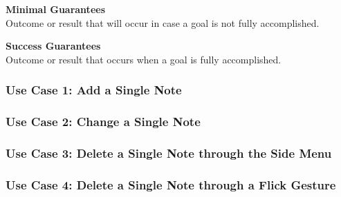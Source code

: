   \textbf{Minimal Guarantees} \\
  Outcome or result that will occur in case a goal is not fully accomplished.

  \textbf{Success Guarantees} \\
  Outcome or result that occurs when a goal is fully accomplished.




  \subsubsection{Use Case 1: Add a Single Note}


  \subsubsection{Use Case 2: Change a Single Note}


  \subsubsection{Use Case 3: Delete a Single Note through the Side Menu}


  \subsubsection{Use Case 4: Delete a Single Note through a Flick Gesture}

